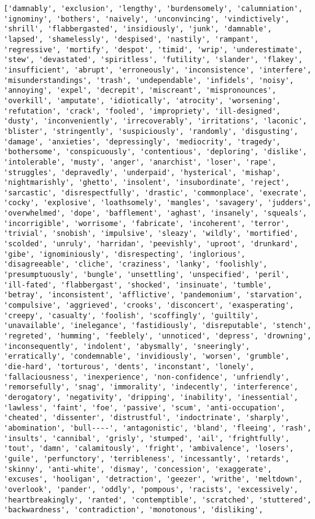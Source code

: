 \documentclass[11pt]{article}
\begin{document}
\begin{Verbatim}[commandchars=\\\{\}]
['damnably', 'exclusion', 'lengthy', 'burdensomely', 'calumniation', 'ignominy', 'bothers', 'naively', 'unconvincing', 'vindictively', 'shrill', 'flabbergasted', 'insidiously', 'junk', 'damnable', 'lapsed', 'shamelessly', 'despised', 'nastily', 'rampant', 'regressive', 'mortify', 'despot', 'timid', 'wrip', 'underestimate', 'stew', 'devastated', 'spiritless', 'futility', 'slander', 'flakey', 'insufficient', 'abrupt', 'erroneously', 'inconsistence', 'interfere', 'misunderstandings', 'trash', 'undependable', 'infidels', 'noisy', 'annoying', 'expel', 'decrepit', 'miscreant', 'mispronounces', 'overkill', 'amputate', 'idiotically', 'atrocity', 'worsening', 'refutation', 'crack', 'fooled', 'impropriety', 'ill-designed', 'dusty', 'inconveniently', 'irrecoverably', 'irritations', 'laconic', 'blister', 'stringently', 'suspiciously', 'randomly', 'disgusting', 'damage', 'anxieties', 'depressingly', 'mediocrity', 'tragedy', 'bothersome', 'conspicuously', 'contentious', 'deploring', 'dislike', 'intolerable', 'musty', 'anger', 'anarchist', 'loser', 'rape', 'struggles', 'depravedly', 'underpaid', 'hysterical', 'mishap', 'nightmarishly', 'ghetto', 'insolent', 'insubordinate', 'reject', 'sarcastic', 'disrespectfully', 'drastic', 'commonplace', 'execrate', 'cocky', 'explosive', 'loathsomely', 'mangles', 'savagery', 'judders', 'overwhelmed', 'dope', 'bafflement', 'aghast', 'insanely', 'squeals', 'incorrigible', 'worrisome', 'fabricate', 'incoherent', 'terror', 'trivial', 'snobish', 'impulsive', 'sleazy', 'wildly', 'mortified', 'scolded', 'unruly', 'harridan', 'peevishly', 'uproot', 'drunkard', 'gibe', 'ignominiously', 'disrespecting', 'inglorious', 'disagreeable', 'cliche', 'craziness', 'lanky', 'foolishly', 'presumptuously', 'bungle', 'unsettling', 'unspecified', 'peril', 'ill-fated', 'flabbergast', 'shocked', 'insinuate', 'tumble', 'betray', 'inconsistent', 'afflictive', 'pandemonium', 'starvation', 'compulsive', 'aggrieved', 'crooks', 'disconcert', 'exasperating', 'creepy', 'casualty', 'foolish', 'scoffingly', 'guiltily', 'unavailable', 'inelegance', 'fastidiously', 'disreputable', 'stench', 'regreted', 'humming', 'feeblely', 'unnoticed', 'depress', 'drowning', 'inconsequently', 'indolent', 'abysmally', 'sneeringly', 'erratically', 'condemnable', 'invidiously', 'worsen', 'grumble', 'die-hard', 'torturous', 'dents', 'inconstant', 'lonely', 'fallaciousness', 'inexperience', 'non-confidence', 'unfriendly', 'remorsefully', 'snag', 'immorality', 'indecently', 'interference', 'derogatory', 'negativity', 'dripping', 'inability', 'inessential', 'lawless', 'faint', 'foe', 'passive', 'scum', 'anti-occupation', 'cheated', 'dissenter', 'distrustful', 'indoctrinate', 'sharply', 'abomination', 'bull----', 'antagonistic', 'bland', 'fleeing', 'rash', 'insults', 'cannibal', 'grisly', 'stumped', 'ail', 'frightfully', 'tout', 'damn', 'calamitously', 'fright', 'ambivalence', 'losers', 'guile', 'perfunctory', 'terribleness', 'incessantly', 'retards', 'skinny', 'anti-white', 'dismay', 'concession', 'exaggerate', 'excuses', 'hooligan', 'detraction', 'geezer', 'writhe', 'meltdown', 'overlook', 'pander', 'oddly', 'pompous', 'racists', 'excessively', 'heartbreakingly', 'ranted', 'contemptible', 'scratched', 'stuttered', 'backwardness', 'contradiction', 'monotonous', 'disliking', 
\end{Verbatim}
\end{document}
